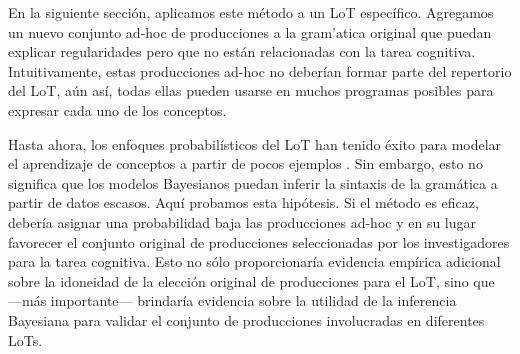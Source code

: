 
En la siguiente sección, aplicamos este método a un LoT específico. Agregamos un nuevo conjunto ad-hoc de producciones a la gram'atica original que puedan explicar regularidades pero que no están relacionadas con la tarea cognitiva. Intuitivamente, estas producciones ad-hoc no deberían formar parte del repertorio del LoT, aún así, todas ellas pueden usarse en muchos programas posibles para expresar cada uno de los conceptos.


Hasta ahora, los enfoques probabilísticos del LoT han tenido éxito para modelar el aprendizaje de conceptos a partir de pocos ejemplos \cite{tenenbaum2011grow,piantadosi2016four}. Sin embargo, esto no significa que los modelos Bayesianos puedan inferir la sintaxis de la gramática a partir de datos escasos. Aquí probamos esta hipótesis. Si el método es eficaz, debería asignar una probabilidad baja las producciones ad-hoc y en su lugar favorecer el conjunto original de producciones seleccionadas por los investigadores para la tarea cognitiva. Esto no sólo proporcionaría evidencia empírica adicional sobre la idoneidad de la elección original de producciones para el LoT, sino que ---más importante--- brindaría evidencia sobre la utilidad de la inferencia Bayesiana para validar el conjunto de producciones involucradas en diferentes LoTs. 

